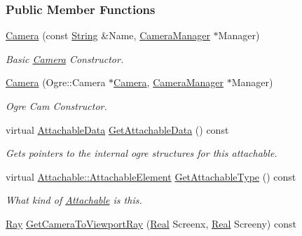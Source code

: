 \subsubsection*{Public Member Functions}
\begin{DoxyCompactItemize}
\item 
\hyperlink{classMezzanine_1_1Camera_a172e91734ebe0cb5d8332ef00606526e}{Camera} (const \hyperlink{namespaceMezzanine_acf9fcc130e6ebf08e3d8491aebcf1c86}{String} \&Name, \hyperlink{classMezzanine_1_1CameraManager}{CameraManager} $\ast$Manager)
\begin{DoxyCompactList}\small\item\em Basic \hyperlink{classMezzanine_1_1Camera}{Camera} Constructor. \item\end{DoxyCompactList}\item 
\hyperlink{classMezzanine_1_1Camera_aa20f07494ece246945eb3cb05f549f82}{Camera} (Ogre::Camera $\ast$\hyperlink{classMezzanine_1_1Camera}{Camera}, \hyperlink{classMezzanine_1_1CameraManager}{CameraManager} $\ast$Manager)
\begin{DoxyCompactList}\small\item\em Ogre Cam Constructor. \item\end{DoxyCompactList}\item 
virtual \hyperlink{structMezzanine_1_1AttachableData}{AttachableData} \hyperlink{classMezzanine_1_1Camera_a9bbd0126f025996457c87fb8564cc38d}{GetAttachableData} () const 
\begin{DoxyCompactList}\small\item\em Gets pointers to the internal ogre structures for this attachable. \item\end{DoxyCompactList}\item 
virtual \hyperlink{classMezzanine_1_1Attachable_a274bd45f9666f6e50f6fdd8a0162bc9e}{Attachable::AttachableElement} \hyperlink{classMezzanine_1_1Camera_a4a8523981c43ba8f4c5358b9ce7aef37}{GetAttachableType} () const 
\begin{DoxyCompactList}\small\item\em What kind of \hyperlink{classMezzanine_1_1Attachable}{Attachable} is this. \item\end{DoxyCompactList}\item 
\hyperlink{classMezzanine_1_1Ray}{Ray} \hyperlink{classMezzanine_1_1Camera_a7dc2eeda0370fd1d942dc4467795d87b}{GetCameraToViewportRay} (\hyperlink{namespaceMezzanine_a726731b1a7df72bf3583e4a97282c6f6}{Real} Screenx, \hyperlink{namespaceMezzanine_a726731b1a7df72bf3583e4a97282c6f6}{Real} Screeny) const 

\end{DoxyCompactItemize}
